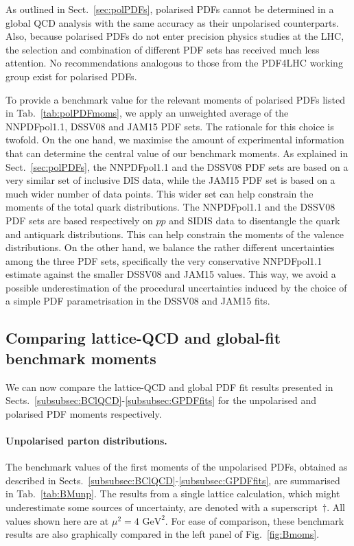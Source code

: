 As outlined in Sect.~\ref{sec:polPDFs}, polarised PDFs cannot be determined in a 
global QCD analysis with the same accuracy as their unpolarised counterparts.
%
Also, because polarised PDFs do not enter precision physics studies at the LHC, the
selection and combination of different PDF sets has received much less
attention.
%
No recommendations analogous to those from the PDF4LHC working group
exist for polarised PDFs.

To provide a benchmark value for the relevant moments of 
polarised PDFs listed in Tab.~\ref{tab:polPDFmoms}, we apply an unweighted 
average of the NNPDFpol1.1, DSSV08 and JAM15 PDF sets.
%
The rationale for this choice is twofold.
%
On the one hand, we maximise the amount of experimental information 
that can determine the central value of our benchmark moments.
%
As explained in Sect.~\ref{sec:polPDFs}, the NNPDFpol1.1 and the DSSV08 PDF 
sets are based on a very similar set of inclusive DIS data, while the JAM15 
PDF set is based on a much wider number of data points.
%
This wider set can help constrain the moments of the total quark 
distributions.
%
The NNPDFpol1.1 and the DSSV08 PDF sets are based respectively on $pp$ and 
SIDIS data to disentangle the quark and antiquark distributions.
%
This can help constrain the moments of the valence distributions.
%
On the other hand, we balance the rather different uncertainties among the 
three PDF sets, specifically the very conservative NNPDFpol1.1 estimate
against the smaller DSSV08 and JAM15 values.
%
This way, we avoid a possible underestimation of the procedural
uncertainties induced by the choice of a simple PDF parametrisation 
in the DSSV08 and JAM15 fits.

\subsection{Comparing lattice-QCD and global-fit benchmark moments}
\label{subsec:BN}

We can now compare the lattice-QCD and global PDF fit results presented in 
Sects.~\ref{subsubsec:BClQCD}-\ref{subsubsec:GPDFfits} for the unpolarised
and polarised PDF moments respectively.

\paragraph{Unpolarised parton distributions.}
%
The benchmark values of the first moments of the unpolarised PDFs, obtained
as described in Sects.~\ref{subsubsec:BClQCD}-\ref{subsubsec:GPDFfits}, 
are summarised in Tab.~\ref{tab:BMunp}.
%
The results from a single lattice calculation, which might underestimate some 
sources of uncertainty, are denoted with a superscript~$\dagger$.
%
All values shown here are at $\mu^2=4\mbox{ GeV}^2$.
%
For ease of comparison, these benchmark results are also graphically
compared in the left panel of Fig.~\ref{fig:Bmoms}.

